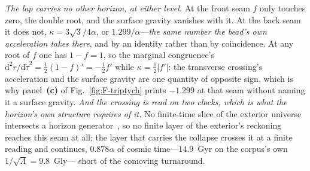 \documentclass[11pt,a4paper]{article}
\theoremstyle{plain}
\theoremstyle{definition}
\theoremstyle{remark}
\newcommand{\dd}{\mathrm{d}}
\begin{document}
\emph{The lap carries no other horizon, at either level.} At the front seam $f$ only touches zero, the double
root, and the surface gravity vanishes with it. At the back seam it does not, $\kappa=3\sqrt3/4\alpha$, or
$1.299/\alpha$---\emph{the same number the bead's own acceleration takes there}, and by an identity rather than
by coincidence. At any root of $f$ one has $1-f=1$, so the marginal congruence's
$\dd^{2}r/\dd\tilde\tau^{2}=\tfrac12(1-f)'=-\tfrac12 f'$ while $\kappa=\tfrac12|f'|$: the transverse crossing's
acceleration and the surface gravity are one quantity of opposite sign, which is why panel~\textbf{(c)} of
Fig.~\ref{fig:F-triptych} prints $-1.299$ at that seam without naming it a surface gravity. \emph{And the
crossing is read on two clocks, which is what the horizon's own structure requires of it.} No finite-time slice
of the exterior universe intersects a horizon generator~\cite{JanzenBHcausality}, so no finite layer of the
exterior's reckoning reaches this seam at all; the layer that carries the collapse crosses it at a finite
reading and continues, $0.878\alpha$ of cosmic time---$14.9$~Gyr on the corpus's own $1/\sqrt\Lambda=9.8$~Gly---
short of the comoving
turnaround.
\end{document}

